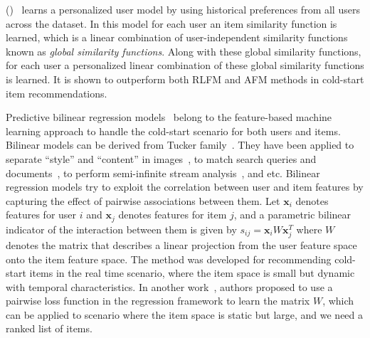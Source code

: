 
\CFLINEXP (\CFLIN)~\cite{elbadrawy2015} learns a personalized user
model by using historical preferences from all users across the dataset. In
this model for each user an item similarity function is learned, which is a
linear combination of user-independent similarity functions known as
\textit{global similarity functions}. Along with these global similarity
functions, for each user a personalized linear combination of these global
similarity functions is learned. It is shown to outperform both RLFM and AFM
methods in cold-start \TOPN item recommendations.


Predictive bilinear regression models~\cite{chu09www} belong to the feature-based
machine learning approach to handle the cold-start scenario for both users and
items. Bilinear models can be derived from Tucker family~\cite{tucker66}. They have
been applied to separate ``style'' and ``content'' in images~\cite{tenenbaum00}, to
match search queries and documents~\cite{wu13jmlr}, to perform semi-infinite stream
analysis~\cite{sun06kdd}, and etc. Bilinear regression models try to exploit the
correlation between user and item features by capturing the effect of pairwise
associations between them. Let $\bm{x}_i$ denotes features for user $i$ and $\bm{x}_j$
denotes features for item $j$, and a parametric bilinear indicator of the
interaction between them is given by $s_{ij} = \bm{x}_iW\bm{x}_j^T$ where $W$ denotes
the matrix that describes a linear projection from the user feature space onto
the item feature space. The method was developed for recommending cold-start
items in the real time scenario, where the item space is small but dynamic
with temporal characteristics. In another work~\cite{park09recsys}, authors proposed to
use a pairwise loss function in the regression framework to learn the matrix
$W$, which can be applied to scenario where the item space is static but
large, and we need a ranked list of items.







